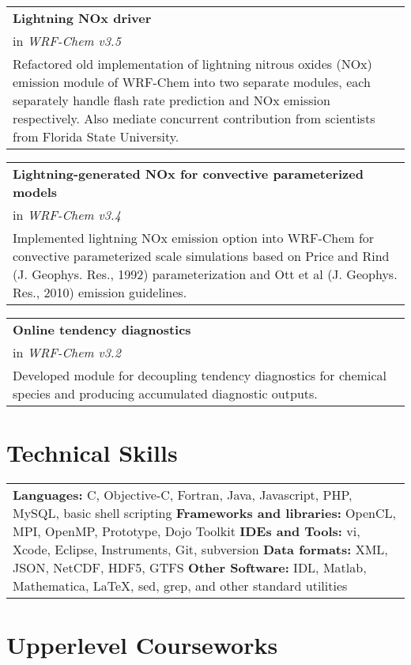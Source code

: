 \documentclass[overlap,12pt,centered]{res}
\makeatletter
\newcommand{\block}{\begin{tabular}{@{}p{6.5in}}}
\makeatother
\begin{document}
\begin{resume}
		\block
		{\bf Lightning NOx driver} \\
		in {\it WRF-Chem v3.5} \\
		Refactored old implementation of lightning nitrous oxides (NOx) emission module of WRF-Chem into two separate modules, each separately handle flash rate prediction and NOx emission respectively. Also mediate concurrent contribution from scientists from Florida State University.
		\end{tabular}
		
		\block
		{\bf Lightning-generated NOx for convective parameterized models} \\
		in {\it WRF-Chem v3.4} \\
		Implemented lightning NOx emission option into WRF-Chem for convective parameterized scale simulations based on Price and Rind (J. Geophys. Res., 1992) parameterization and Ott et al (J. Geophys. Res., 2010) emission guidelines.
		\end{tabular}
		
		\block
		{\bf Online tendency diagnostics} \\
		in {\it WRF-Chem v3.2} \\
		Developed module for decoupling tendency diagnostics for chemical species and producing accumulated diagnostic outputs.
		\end{tabular}
		
		\section{\sc Technical Skills}
		\block
		{\bf Languages: } C, Objective-C, Fortran, Java, Javascript, PHP, MySQL, basic shell scripting \newline
		{\bf Frameworks and libraries:} OpenCL, MPI, OpenMP, Prototype, Dojo Toolkit \newline
		{\bf IDEs and Tools: } vi, Xcode, Eclipse, Instruments, Git, subversion \newline
		{\bf Data formats: } XML, JSON, NetCDF, HDF5, GTFS \newline
		{\bf Other Software: } IDL, Matlab, Mathematica, \LaTeX, sed, grep, and other standard utilities
		\end{tabular}
		
		\section{\sc Upperlevel Courseworks}
		

\end{resume}
\end{document}
